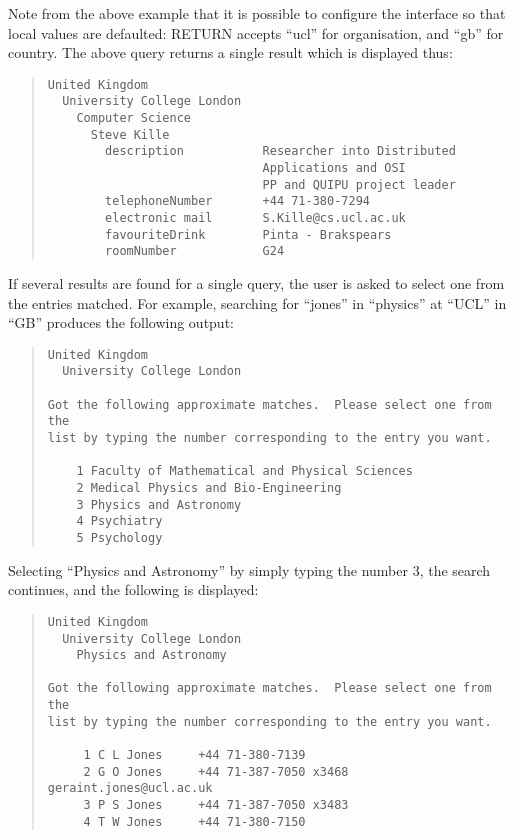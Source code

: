 Note from the above example that it is possible to configure the interface 
so that local values are defaulted: RETURN accepts ``ucl'' for organisation,
and ``gb'' for country.  The above query returns a single result which is
displayed thus:

\begin{quote}\footnotesize\begin{verbatim}
United Kingdom
  University College London
    Computer Science
      Steve Kille
        description           Researcher into Distributed 
                              Applications and OSI
                              PP and QUIPU project leader
        telephoneNumber       +44 71-380-7294
        electronic mail       S.Kille@cs.ucl.ac.uk
        favouriteDrink        Pinta - Brakspears
        roomNumber            G24
\end{verbatim}\end{quote}

If several results are found for a single query, the user is asked to select
one from the entries matched.  For example, searching for ``jones'' in
``physics'' at ``UCL'' in ``GB'' produces the following output:

\begin{quote}\footnotesize\begin{verbatim}
United Kingdom
  University College London

Got the following approximate matches.  Please select one from the 
list by typing the number corresponding to the entry you want.

    1 Faculty of Mathematical and Physical Sciences
    2 Medical Physics and Bio-Engineering
    3 Physics and Astronomy
    4 Psychiatry
    5 Psychology
\end{verbatim}\end{quote}

Selecting ``Physics and Astronomy'' by simply typing the number 3, the
search continues, and the following is displayed:

\begin{quote}\footnotesize\begin{verbatim}
United Kingdom
  University College London
    Physics and Astronomy

Got the following approximate matches.  Please select one from the
list by typing the number corresponding to the entry you want.

     1 C L Jones     +44 71-380-7139
     2 G O Jones     +44 71-387-7050 x3468  geraint.jones@ucl.ac.uk
     3 P S Jones     +44 71-387-7050 x3483
     4 T W Jones     +44 71-380-7150
\end{verbatim}\end{quote}

